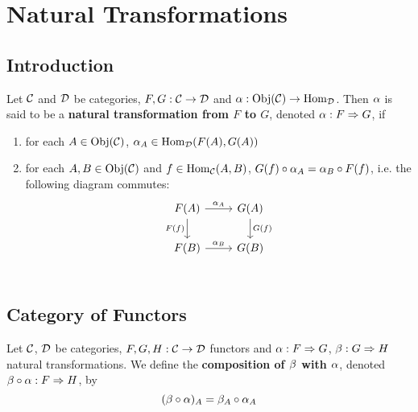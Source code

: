 \documentclass{book}
\begin{document}
	
	
	
	
	
	
	
	
	
	
	
	
	\newpage
	\section{Natural Transformations}
	
	\subsection{Introduction}
	
	\begin{defn} 
		Let $\mathcal{C}$ and $\mathcal{D}$ be categories, $F, G: \mathcal{C} \rightarrow \mathcal{D}$ and $ \alpha : \operatorname{Obj}(\mathcal{C}) \rightarrow  \operatorname{Hom}_{\mathcal{D}}$. Then $\alpha$ is said to be a \textbf{natural transformation from $F$ to $G$}, denoted $\alpha: F \Rightarrow G$, if
		\begin{enumerate}
			\item for each $A \in \operatorname{Obj}(\mathcal{C})$, $\alpha_A \in \operatorname{Hom}_{\mathcal{D}}(F(A), G(A))$
			\item for each $A, B \in \operatorname{Obj}(\mathcal{C})$ and $f \in \operatorname{Hom}_{\mathcal{C}}(A,B)$, $G(f) \circ \alpha_A = \alpha_B \circ F(f)$, i.e. the following diagram commutes: 
			\[ 
			\begin{tikzcd}
				F(A)  \arrow[r, "\al_A"]  \arrow[d, "F(f)"']  & G(A)   \arrow[d, "G(f)"]\\
				F(B) \arrow[r, "\al_B"] &  G(B) \\
			\end{tikzcd}
			\]
		\end{enumerate}
	\end{defn}






	
	
	
	
	
	
	
	
	
	
	\subsection{Category of Functors}
	\begin{defn} 
		Let $\mathcal{C}$, $\mathcal{D}$ be categories, $F, G, H:\mathcal{C} \rightarrow \mathcal{D}$ functors and $\alpha: F \Rightarrow G$, $\beta : G \Rightarrow H$ natural transformations. We define the \textbf{composition of $\beta$ with $\alpha$}, denoted $\beta \circ \alpha: F \Rightarrow H$, by 
		$$(\beta \circ \alpha)_{A} = \beta_A \circ \alpha_A$$ 
	\end{defn}
	
\end{document}
